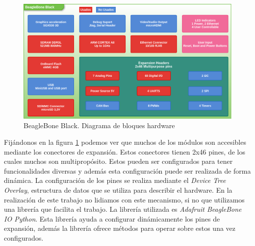 	\begin{figure}[h]
		\centering
		\includegraphics[keepaspectratio, width=1\textwidth]{./img/beaglebone.png}
		\caption{BeagleBone Black. Diagrama de bloques hardware}
		\label{fig:beaglebone}
	\end{figure}
	\par
	Fijándonos en la figura \ref{fig:beaglebone} podemos ver que muchos de los módulos son accesibles mediante los conectores de
	expansión\cite{BeagleWikiExp}. Estos conectores tienen 2x46 pines, de los cuales muchos son multipropósito. Estos pueden ser configurados para tener
	funcionalidades diversas y además esta configuración puede ser realizada de forma dinámica. La configuración de los pines se realiza mediante
	el \emph{Device Tree Overlay}, estructura de datos que se utiliza para describir el hardware. En la realización de este trabajo no lidiamos
	con este mecanismo, si no que utilizamos una librería que facilita el trabajo. La librería utilizada es \emph{Adafruit BeagleBone IO
	Python}\cite{AdaFruitGit}. Esta librería ayuda a configurar dinámicamente los pines de expansión, además la librería ofrece métodos para
	operar sobre estos una vez configurados.

